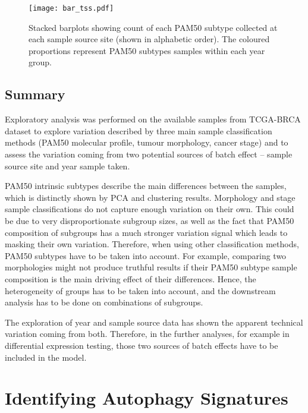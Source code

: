             \begin{figure}[!h]
            \centering
            \texttt{[image: bar\_tss.pdf]}
            \caption[Stacked barplots of sample counts per year]{Stacked barplots showing count of each PAM50 subtype collected at each sample source site (shown in alphabetic order). The coloured proportions represent PAM50 subtypes samples within each year group. }
            \label{fig:bartss}
            \end{figure}
    
    
    \subsection{Summary}
    
   Exploratory analysis was performed on the available samples from TCGA-BRCA dataset to explore variation described by three main sample classification methods (PAM50 molecular profile, tumour morphology, cancer stage) and to assess the variation coming from two potential sources of batch effect -- sample source site and year sample taken. 

    PAM50 intrinsic subtypes describe the main differences between the samples, which is distinctly shown by PCA and clustering results. Morphology and stage sample classifications do not capture enough variation on their own. This could be due to very disproportionate subgroup sizes, as well as the fact that PAM50 composition of subgroups has a much stronger variation signal which leads to masking their own variation.
    Therefore, when using other classification methods, PAM50 subtypes have to be taken into account. For example, comparing two morphologies might not produce truthful results if their PAM50 subtype sample composition is the main driving effect of their differences. Hence, the heterogeneity of groups has to be taken into account, and the downstream analysis has to be done on combinations of subgroups. 

    The exploration of year and sample source data has shown the apparent technical variation coming from both. Therefore, in the further analyses, for example in differential expression testing, those two sources of batch effects have to be included in the model. 


\newpage
\section{Identifying Autophagy Signatures}

